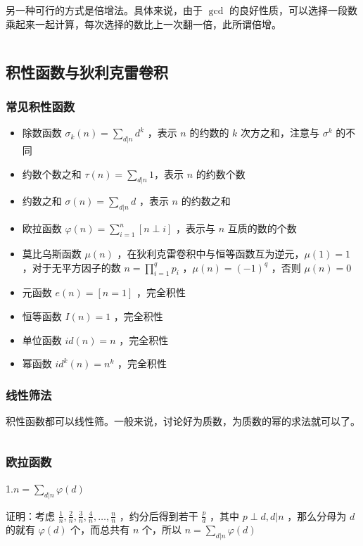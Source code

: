 \documentclass[UTF-8]{ctexart}
\newcommand{\cpp}[1]{\inputminted[bgcolor=bg,breaklines,breakanywhere=true]{c++}{#1}}
\begin{document}
			\cpp{code//Math//pollardrho-floyed.cpp}
			
			另一种可行的方式是倍增法。具体来说，由于 $\gcd$ 的良好性质，可以选择一段数乘起来一起计算，每次选择的数比上一次翻一倍，此所谓倍增。
			
			\cpp{code//Math//pollardrho-mult.cpp}
		\subsection{积性函数与狄利克雷卷积}
			\subsubsection{常见积性函数}
			\begin{itemize}
				\item 除数函数 $\sigma _ k (n)=\sum _ {d|n} d ^ k$ ，表示 $n$ 的约数的 $k$ 次方之和，注意与 $\sigma ^ k$ 的不同   
				\item 约数个数之和 $\tau(n)=\sum _ {d|n} 1$，表示 $n$  的约数个数  
				\item 约数之和 $\sigma(n)=\sum _ {d|n} d$ ，表示 $n$  的约数之和  
				\item 欧拉函数 $\varphi(n)=\sum _ {i=1} ^ n [n \perp i]$ ，表示与 $n$ 互质的数的个数  
				\item 莫比乌斯函数 $\mu(n)$ ，在狄利克雷卷积中与恒等函数互为逆元，$\mu(1)=1$ ，对于无平方因子的数 $n=\prod _ {i=1} ^ q p _ i$ ，$\mu(n)=(-1) ^ q$ ，否则 $\mu(n)=0$  
				\item 元函数 $e(n)=[n=1]$ ，完全积性  
				\item 恒等函数 $I(n)=1$ ，完全积性  
				\item 单位函数 $id(n)=n$ ，完全积性  
				\item 幂函数 $id ^ k (n)=n ^ k$ ，完全积性
			\end{itemize}
			\subsubsection{线性筛法}
			积性函数都可以线性筛。一般来说，讨论好为质数，为质数的幂的求法就可以了。
			
			\cpp{code//Math//sieve.cpp}
			\subsubsection{欧拉函数}
			1.$n=\sum _ {d|n} \varphi(d)$
	
			证明：考虑 $\frac{1}{n},\frac{2}{n},\frac{3}{n},\frac{4}{n},\dots,\frac{n}{n}$ ，约分后得到若干 $\frac{p}{d}$ ，其中 $p \perp d,d|n$ ，那么分母为 $d$ 的就有 $\varphi(d)$ 个，而总共有 $n$ 个，所以 $n=\sum _ {d|n} \varphi(d)$
	
\end{document}

